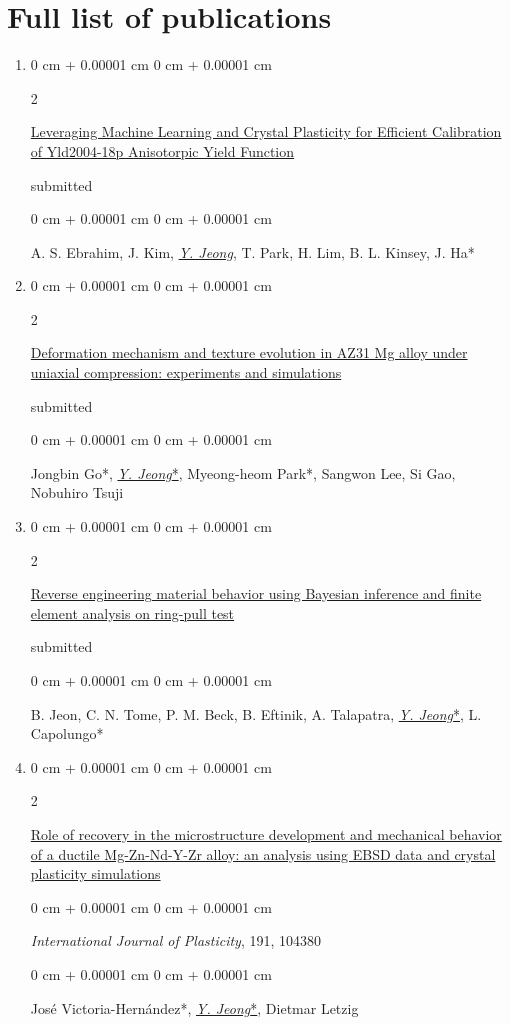 \documentclass[10pt, letterpaper]{article}
\newenvironment{onecolentry}{
    \begin{adjustwidth}{
        0 cm + 0.00001 cm
    }{
        0 cm + 0.00001 cm
    }
}{
    \end{adjustwidth}
} %
\newenvironment{twocolentry}[2][]{
    \onecolentry
    \def\secondColumn{#2}
    \setcolumnwidth{\fill, 4.5 cm}
    \begin{paracol}{2}
}{
    \switchcolumn \raggedleft \secondColumn
    \end{paracol}
    \endonecolentry
} %
\begin{document}
        \section{Full list of publications}
        \begin{enumerate}


        \item
          \begin{twocolentry}{submitted}
            \href{}{Leveraging Machine Learning and Crystal Plasticity for Efficient Calibration of Yld2004-18p Anisotorpic Yield Function}
          \end{twocolentry}
          \begin{onecolentry}
            A. S. Ebrahim,  J. Kim, {\underline{\textit{Y. Jeong}}}, T. Park, H. Lim, B. L. Kinsey, J. Ha*
          \end{onecolentry}
          \vspace{0.10 cm}


        \item
          \begin{twocolentry}{submitted}
            \href{}{Deformation mechanism and texture evolution in AZ31 Mg alloy under uniaxial compression: experiments and simulations}
          \end{twocolentry}
          \begin{onecolentry}
            Jongbin Go*,  {\underline{\textit{Y. Jeong}*}}, Myeong-heom Park*, Sangwon Lee, Si Gao, Nobuhiro Tsuji
          \end{onecolentry}
          \vspace{0.10 cm}


        \item
          \begin{twocolentry}{submitted}
            \href{}{Reverse engineering material behavior using Bayesian inference and finite element analysis on ring-pull test}
          \end{twocolentry}
          \begin{onecolentry}
            B. Jeon, C. N. Tome, P. M. Beck, B. Eftinik, A. Talapatra, {\underline{\textit{Y. Jeong}*}}, L. Capolungo*
          \end{onecolentry}
          \vspace{0.10 cm}


        \item
          \begin{twocolentry}{2025}
            \href{https://doi.org/10.1016/j.ijplas.2025.104380}{Role of recovery in the microstructure development and mechanical behavior of a ductile Mg-Zn-Nd-Y-Zr alloy: an analysis using EBSD data and crystal plasticity simulations}
        \end{twocolentry}
        \begin{onecolentry}
            {\it International Journal of Plasticity}, 191, 104380
        \end{onecolentry}
        \begin{onecolentry}
            José Victoria-Hernández*, {\underline{\textit{Y. Jeong}*}}, Dietmar Letzig
        \end{onecolentry}
        \vspace{0.10 cm}



\end{enumerate}
\end{document}
